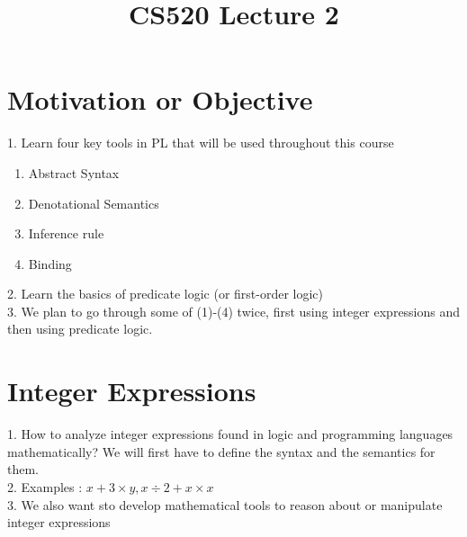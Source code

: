 \documentclass{article}[12pt]
\begin{document}
  {\topsep}{\topsep}%
  {\itshape}{}%
  {\bfseries}{}%
  {\newline}{}%

\theoremstyle{break}

\newtheorem{theorem}{Theorem}[section]
\newtheorem{definition}{Definition}
\newtheorem{proposition}{Proposition}
\newtheorem{corollary}{Corollary}
\newtheorem{lemma}{Lemma}
\newtheorem{example}{Example}
\newcommand{\nonterminal}[1]{\langle \text{#1}\rangle}
\newcommand{\rem}[0]{\text{ rem }}

\title{CS520 Lecture 2}
\Large
\maketitle

\section{Motivation or Objective}
1. Learn four key tools in PL that will be used throughout this course \\
\begin{enumerate}
    \item Abstract Syntax
    \item Denotational Semantics
    \item Inference rule
    \item Binding
\end{enumerate}
2. Learn the basics of predicate logic (or first-order logic)\\
3. We plan to go through some of (1)-(4) twice, first using integer expressions and then using predicate logic.\\
\section{Integer Expressions}
1. How to analyze integer expressions found in logic and programming languages mathematically? We will first have to define the syntax and the semantics for them. \\
2. Examples : $x+3\times y, x\div 2 + x \times x$\\
3. We also want sto develop mathematical tools to reason about or manipulate integer expressions
\end{document}
